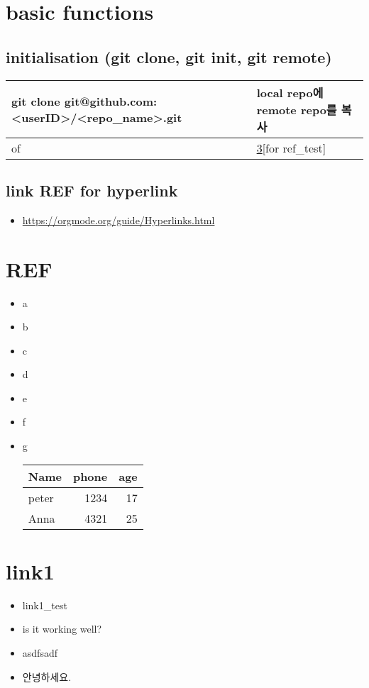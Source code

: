 \documentclass[11pt]{article}
\author{JJ Kim}
\date{\today}
\title{}
\begin{document}
\tableofcontents


\section{basic functions}
\label{sec:org098a25f}
\subsection{initialisation (git clone, git init, git remote)}
\label{sec:org941990a}
\begin{center}
\begin{tabular}{ll}
git clone git@github.com:<userID>/<repo\_name>.git & local repo에 remote repo를 복사\\
\hline
of & \ref{sec:orgad1ee5a}[for ref\_test]\\
\end{tabular}
\end{center}
\subsection{link REF for hyperlink}
\label{sec:org904c22e}
\begin{itemize}
\item \url{https://orgmode.org/guide/Hyperlinks.html}
\end{itemize}
\section{REF}
\label{sec:org06360d6}
\begin{itemize}
\item a
\item b
\item c
\item d
\item e
\item f
\item g
\begin{center}
\begin{tabular}{lrr}
Name & phone & age\\
\hline
peter & 1234 & 17\\
Anna & 4321 & 25\\
\end{tabular}
\end{center}
\end{itemize}
\section{link1}
\label{sec:orgad1ee5a}
\begin{itemize}
\item link1\_test
\item is it working well?
\item asdfsadf
\item 안녕하세요.
\end{itemize}
\end{document}
